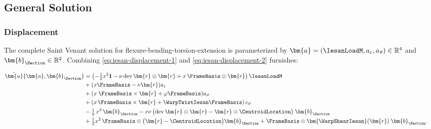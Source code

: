 \subsection{General Solution}
\subsubsection{Displacement}

The complete Saint Venant solution for flexure-bending-torsion-extension is parameterized by \(\bm{a} = (\IesanLoadM, a_{\varepsilon}, a_{\vartheta})\in\mathbb{R}^4\) and \(\bm{b}_{\Section}\in \mathbb{R}^2\).
Combining \eqref{eq:iesan-displacement-1} and \eqref{eq:iesan-displacement-2} furnishes:

\begin{equation}
\begin{aligned}
  \hat{\bm{u}}\{\bm{a},\bm{b}_{\Section}\}
    &= 
      \left(-\tfrac{1}{2}x^2 \mathbf{1} - \nu\operatorname{dev}\bm{r}\otimes\bm{r} + x\, \FrameBasis\otimes\bm{r}\right)\IesanLoadM \\ 
    &+ (x\FrameBasis - \nu \bm{r})a_{\varepsilon} \\
    &+(x\; \FrameBasis\times \bm{r} + \varphi \FrameBasis)a_{\vartheta}\\
    & + (x\,\FrameBasis\times\bm{r}+ \WarpTwistIesan\FrameBasis)\, c_{\vartheta} \\
    &-\tfrac{1}{6}\,x^3\,\bm{b}_{\Section}
      - x\nu \, \bigl(\operatorname{dev}\bm{r}\otimes\bm{r} - \bm{r}\otimes\CentroidLocation\bigr)\;\bm{b}_{\Section} \\
    &+\tfrac{1}{2}x^2\,\FrameBasis\otimes\big(\bm{r} -\CentroidLocation\big)\bm{b}_{\Section}
    + \FrameBasis\otimes\bm{\WarpShearIesan}(\bm{r})\;\bm{b}_{\Section} .
\end{aligned}
\end{equation}

